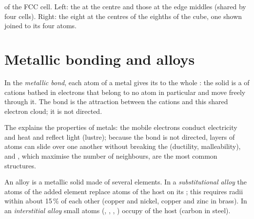 \begin{omfigure}
{\small {} of the FCC cell. Left: the  at
the centre and those at the edge middles (shared by four cells). Right:
the eight  at the centres of the eighths of the cube,
one shown joined to its four atoms.}
\end{omfigure}

\section{Metallic bonding and alloys}

\begin{definition}\label{def:b1:crystals-metals:metallic-bond}
In the \emph{metallic bond}, each atom of a metal
gives its  to the whole : the solid is a 
of cations bathed in electrons that belong to no atom in particular and
move freely through it. The bond is the attraction between the cations
and this shared electron cloud; it is not directed.
\end{definition}

\begin{proposition}\label{prop:b1:crystals-metals:properties}
The  explains the properties of metals: the mobile electrons
conduct electricity and heat and reflect light (lustre); because the bond
is not directed, layers of atoms can slide over one another without
breaking the  (ductility, malleability), and , which
maximise the number of neighbours, are the most common structures.
\end{proposition}
\admitted

\begin{definition}[Alloys]\label{def:b1:crystals-metals:alloy}
An alloy is a metallic solid made of several elements. In a
\emph{substitutional alloy} the atoms of the
added element replace atoms of the host on its ; this requires
radii within about 15\,\% of each other (copper and nickel, copper and
zinc in brass). In an \emph{interstitial alloy}
small atoms (, , , ) occupy  of
the host (carbon in steel).
\end{definition}

